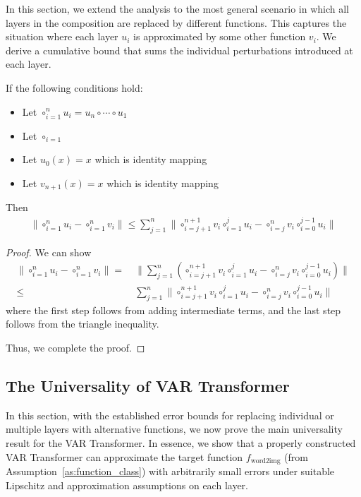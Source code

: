 In this section, we extend the analysis to the most general scenario in which all layers in the composition are replaced by different functions. This captures the situation where each layer $u_i$ is approximated by some other function $v_i$. We derive a cumulative bound that sums the individual perturbations introduced at each layer.

\begin{lemma}
    If the following conditions hold:
    \begin{itemize}
        \item Let $\circ_{i=1}^n u_i  = u_n \circ \cdots \circ u_1$
        \item Let $\circ_{i=1}$
        \item Let $u_0(x) = x$ which is identity mapping
        \item Let $v_{n+1}(x) = x$ which is identity mapping
    \end{itemize}
    Then 
    \begin{align*}
        \| \circ_{i=1}^n u_i - \circ_{i=1}^n v_i \| \leq\sum_{j=1}^{n} \| \circ_{i=j+1}^{n+1} v_i  \circ_{i=1}^j u_i - \circ_{i=j}^n v_i  \circ_{i=0}^{j-1} u_i \|
    \end{align*}
\end{lemma}
\begin{proof}
    We can show
    \begin{align*}
        \| \circ_{i=1}^n u_i - \circ_{i=1}^n v_i \| 
        = & ~ \| \sum_{j=1}^{n} ( \circ_{i=j+1}^{n+1} v_i  \circ_{i=1}^j u_i - \circ_{i=j}^n v_i  \circ_{i=0}^{j-1} u_i ) \| \\
        \leq & ~  
        \sum_{j=1}^{n} \| \circ_{i=j+1}^{n+1} v_i  \circ_{i=1}^j u_i - \circ_{i=j}^n v_i  \circ_{i=0}^{j-1} u_i \|
    \end{align*}
    where the first step follows from adding intermediate terms, and the last step follows from the triangle inequality.
    
Thus, we complete the proof.
\end{proof}

\subsection{The Universality of VAR Transformer}\label{sec:var_universality}

In this section, with the established error bounds for replacing individual or multiple layers with alternative functions, we now prove the main universality result for the VAR Transformer. In essence, we show that a properly constructed VAR Transformer can approximate the target function $f_\mathrm{word2img}$ (from Assumption~\ref{as:function_class}) with arbitrarily small errors under suitable Lipschitz and approximation assumptions on each layer.

